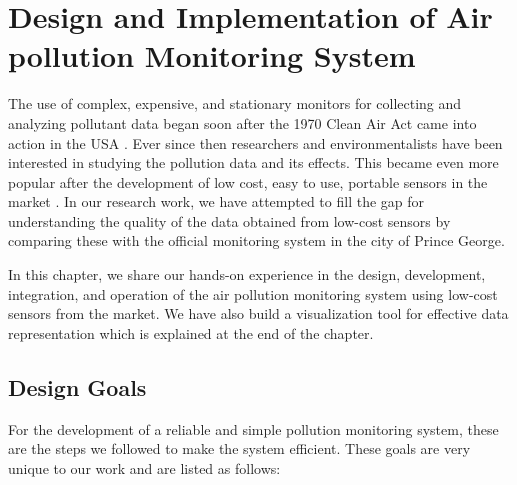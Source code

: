 
\chapter{Design and Implementation of Air pollution Monitoring System}

  
The use of complex, expensive, and stationary monitors for collecting and analyzing pollutant data began soon after the 1970 Clean Air Act came into action in the USA \cite{Daly2007}. Ever since then researchers and environmentalists have been interested in studying the pollution data and its effects. This became even more popular after the development of low cost, easy to use, portable sensors in the market \cite{Snyder2013}. In our research work, we have attempted to fill the gap for understanding the quality of the data obtained from low-cost sensors by comparing these with the official monitoring system in the city of Prince George. 

In this chapter, we share our hands-on experience in the design, development, integration, and operation of the air pollution monitoring system using low-cost sensors from the market. We have also build a visualization tool for effective data representation which is explained at the end of the chapter.



\section{Design Goals}

For the development of a reliable and simple pollution monitoring system, these are the steps we followed to make the system efficient. These goals are very unique to our work and are listed as follows: 


